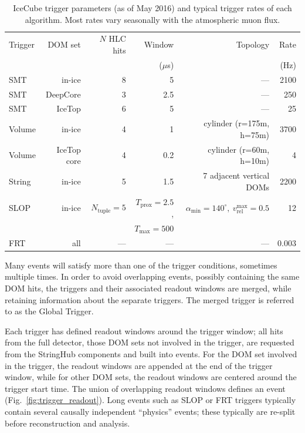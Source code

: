 \begin{table}
  \centering \footnotesize
\begin{tabular}{lrrrrr}
  \hline Trigger & DOM set & $N$ HLC hits & Window & Topology & Rate\\
  & & & ($\mu$s) & & (Hz) \\
  \hline
  SMT & in-ice & 8 & 5 & --- & 2100\\
  SMT & DeepCore & 3 & 2.5 & --- & 250\\
  SMT & IceTop & 6 & 5 & --- & 25\\
  Volume & in-ice & 4 & 1 & cylinder (r=175m, h=75m) & 3700\\
  Volume & IceTop core & 4 & 0.2 & cylinder (r=60m, h=10m) & 4\\
  String & in-ice & 5 & 1.5 & 7 adjacent vertical DOMs & 2200\\
  SLOP & in-ice & $N_{\mathrm{tuple}} = 5$ & $T_{\mathrm{prox}} = 2.5$, &
  $\alpha_{\mathrm{min}} = 140^\circ,\ v_{\mathrm{rel}}^{\mathrm{max}} = 0.5$ & 12\\
  & & & $T_{\mathrm{max}} = 500$ & &\\
  FRT & all & --- & --- & --- & 0.003\\
  \hline
\end{tabular}
\caption{IceCube trigger parameters (as of May 2016) and typical trigger
  rates of each algorithm.  Most rates vary seasonally with the atmospheric
  muon flux.}
\label{tab:triggers}
\end{table}

Many events will satisfy more than one of the trigger conditions, sometimes
multiple times.  In order to avoid overlapping events, possibly containing
the same DOM hits, the triggers and their associated readout windows are
merged, while retaining information about the separate triggers.  The
merged trigger is referred to as the Global Trigger.

Each trigger has defined readout windows around the trigger window; all
hits from the full detector, those DOM sets not involved in the trigger,
are requested from the StringHub components and built into events.  For the
DOM set involved in the trigger, the readout windows are appended at the end of the trigger
window, while for other DOM sets, the readout windows are centered around
the trigger start time.  The union of overlapping readout windows defines
an event (Fig.~\ref{fig:trigger_readout}).  Long events such as SLOP or FRT
triggers typically contain several causally independent ``physics'' events;
these typically are re-split before reconstruction and analysis.

